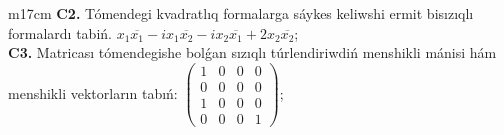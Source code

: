\documentclass{article}
\begin{document}
\begin{tabular}{m{17cm}}
\textbf{C2.} Tómendegi kvadratlıq formalarga sáykes keliwshi ermit bisızıqlı formalardı tabiń. \(x_{1}\overline{x_{1}} - ix_{1}\overline{x_{2}} - ix_{2}\overline{x_{1}} + 2x_{2}\overline{x_{2}}\); \\
\textbf{C3.} Matricası tómendegishe bolǵan sızıqlı túrlendiriwdiń menshikli mánisi hám menshikli vektorların tabıń: \(\begin{pmatrix} 1 & 0 & 0 & 0 \\ 0 & 0 & 0 & 0 \\ 1 & 0 & 0 & 0 \\ 0 & 0 & 0 & 1 \end{pmatrix}\); \\

\end{tabular}
\vspace{1cm}
\end{document}

